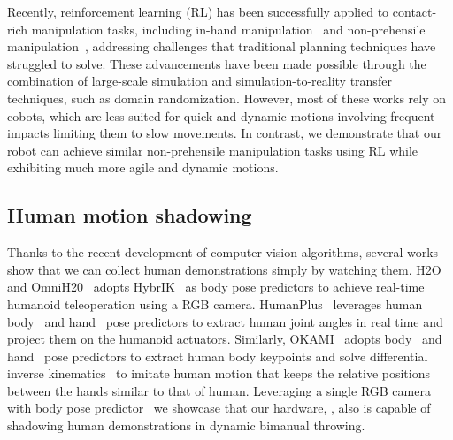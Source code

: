 Recently, reinforcement learning (RL) has been successfully applied to contact-rich manipulation tasks, including in-hand manipulation~\cite{chen2022system, andrychowicz2020learning, allshire2022transferring, handa2023dextreme} and non-prehensile manipulation~\cite{zhou2023hacman, zhou2023learning, cho2024corn, kim2023pre}, addressing challenges that traditional planning techniques have struggled to solve. These advancements have been made possible through the combination of large-scale simulation and simulation-to-reality transfer techniques, such as domain randomization. However, most of these works rely on cobots, which are less suited for quick and dynamic motions involving frequent impacts limiting them to slow movements. In contrast, we demonstrate that our robot can achieve similar non-prehensile manipulation tasks using RL while exhibiting much more agile and dynamic motions.

\subsection{Human motion shadowing}

Thanks to the recent development of computer vision algorithms, several works show that we can collect human demonstrations simply by watching them. H2O~\cite{h2o} and OmniH20~\cite{omnih2o} adopts HybrIK~\cite{hybrik} as body pose predictors to achieve real-time humanoid teleoperation using a RGB camera. HumanPlus~\cite{humanplus} leverages human body~\cite{wham} and hand~\cite{hamer} pose predictors to extract human joint angles in real time and project them on the humanoid actuators. Similarly, OKAMI~\cite{okami} adopts body~\cite{slahmr} and hand~\cite{hamer} pose predictors to extract human body keypoints and solve differential inverse kinematics~\cite{pink} to imitate human motion that keeps the relative positions between the hands similar to that of human. Leveraging a single RGB camera with body pose predictor~\cite{wham} we showcase that our hardware, \robot, also is capable of shadowing human demonstrations in dynamic bimanual throwing. 
